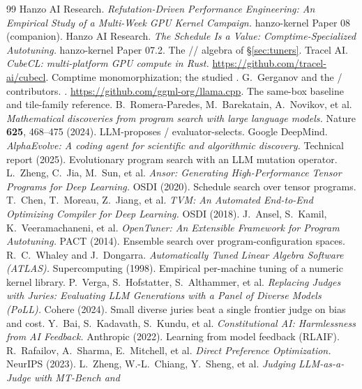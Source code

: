 \documentclass[11pt]{article}
\begin{document}
\begin{thebibliography}{99}
\small
{} Hanzo AI Research. \emph{Refutation-Driven Performance Engineering: An Empirical Study
of a Multi-Week GPU Kernel Campaign.} hanzo-kernel Paper 08 (companion).
 Hanzo AI Research. \emph{The Schedule Is a Value: Comptime-Specialized Autotuning.}
hanzo-kernel Paper 07.2. The // algebra of \S\ref{sec:tuners}.
 Tracel AI. \emph{CubeCL: multi-platform GPU compute in Rust.}
\url{https://github.com/tracel-ai/cubecl}. Comptime monomorphization; the studied .
 G.~Gerganov and the / contributors. \emph{.}
\url{https://github.com/ggml-org/llama.cpp}. The same-box baseline and tile-family reference.
 B.~Romera-Paredes, M.~Barekatain, A.~Novikov, et al. \emph{Mathematical discoveries from
program search with large language models.} Nature \textbf{625}, 468--475 (2024). LLM-proposes /
evaluator-selects.
 Google DeepMind. \emph{AlphaEvolve: A coding agent for scientific and algorithmic
discovery.} Technical report (2025). Evolutionary program search with an LLM mutation operator.
 L.~Zheng, C.~Jia, M.~Sun, et al. \emph{Ansor: Generating High-Performance Tensor Programs for
Deep Learning.} OSDI (2020). Schedule search over tensor programs.
 T.~Chen, T.~Moreau, Z.~Jiang, et al. \emph{TVM: An Automated End-to-End Optimizing Compiler for
Deep Learning.} OSDI (2018).
 J.~Ansel, S.~Kamil, K.~Veeramachaneni, et al. \emph{OpenTuner: An Extensible Framework
for Program Autotuning.} PACT (2014). Ensemble search over program-configuration spaces.
 R.~C.~Whaley and J.~Dongarra. \emph{Automatically Tuned Linear Algebra Software (ATLAS).}
Supercomputing (1998). Empirical per-machine tuning of a numeric kernel library.
 P.~Verga, S.~Hofstatter, S.~Althammer, et al. \emph{Replacing Judges with Juries: Evaluating
LLM Generations with a Panel of Diverse Models (PoLL).} Cohere (2024). Small diverse juries beat a single
frontier judge on bias and cost.
 Y.~Bai, S.~Kadavath, S.~Kundu, et al. \emph{Constitutional AI: Harmlessness from AI Feedback.}
Anthropic (2022). Learning from model feedback (RLAIF).
 R.~Rafailov, A.~Sharma, E.~Mitchell, et al. \emph{Direct Preference Optimization.} NeurIPS
(2023).
 L.~Zheng, W.-L.~Chiang, Y.~Sheng, et al. \emph{Judging LLM-as-a-Judge with MT-Bench and
}
\end{thebibliography}
\end{document}
